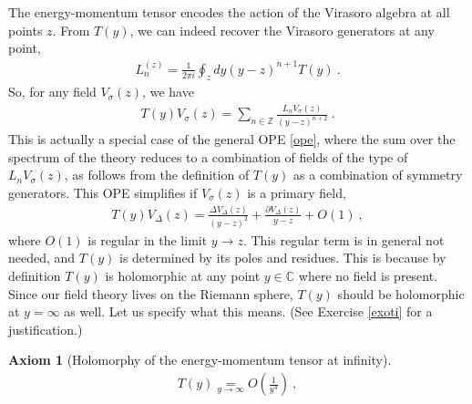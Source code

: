 \documentclass[12pt, a4paper, notitlepage, twoside]{report}
\numberwithin{equation}{section}
\theoremstyle{break}
\newtheorem{hyp}{Axiom}[chapter]
\begin{document}
The energy-momentum tensor encodes the action of the Virasoro algebra at all points $z$. 
From $T(y)$, we can indeed recover the Virasoro generators at any point,
\begin{align}
\boxed{ L_n^{(z)} = \frac{1}{2\pi i}\oint_{z} dy (y-z)^{n+1} T(y)} \ .
\label{lit}
\end{align}
So, for any field $V_\sigma(z)$, we have
\begin{align}
 T(y)V_\sigma(z) = \sum_{n\in{\mathbb{Z}}} \frac{L_n V_\sigma(z)}{(y-z)^{n+2}}\ .
\label{tv}
\end{align}
This is actually a special case of the general OPE \eqref{ope}, where the sum over the spectrum of the theory reduces to a combination of fields of the type of $L_n V_\sigma(z)$, as follows from the definition of $T(y)$ as a combination of symmetry generators.
This OPE simplifies if $V_\sigma(z)$ is a primary field, 
\begin{align}
 \boxed{T(y) V_\Delta(z) = \frac{\Delta V_\Delta(z)}{(y-z)^2} + \frac{\partial V_\Delta(z)}{y-z} + O(1)}\ ,
\label{tvp}
\end{align}
where $O(1)$ is regular in the limit $y\to z$.
This regular term is in general not needed, and $T(y)$ is determined by its poles and residues. This is because by definition $T(y)$ is holomorphic at any point $y\in\mathbb{C}$ where no field is present.
Since our field theory lives on the Riemann sphere, $T(y)$ should be holomorphic at $y=\infty$ as well. Let us specify what this means. (See Exercise \ref{exoti} for a justification.)

\begin{hyp}[Holomorphy of the energy-momentum tensor at infinity]
 \label{ax:hti}
 \begin{align}
 \boxed{T(y) \underset{y\to \infty}{=} O\left(\frac{1}{y^4}\right)}\ ,
\label{tyi}
\end{align}
\end{hyp} 
\noindent
\end{document}
